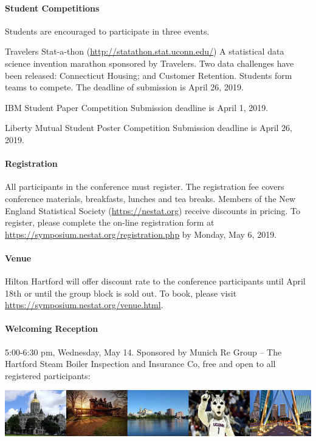 \documentclass[12pt]{article}
\begin{document}
\paragraph{Student Competitions} Students are encouraged to participate in three events.

\textsf{Travelers Stat-a-thon} (\url{http://statathon.stat.uconn.edu/})
A statistical data science invention marathon sponsored by Travelers. Two data challenges have been released: Connecticut Housing; and Customer Retention. Students form teams to compete. The deadline of submission is April 26, 2019.

\textsf{IBM Student Paper Competition} Submission deadline is April 1, 2019.

\textsf{Liberty Mutual Student Poster Competition} Submission deadline is April 26, 2019.


\paragraph{Registration}
All participants in the conference must register. The registration fee
covers conference materials, breakfasts, lunches and tea
breaks. Members of the New England Statistical Society
(\url{https://nestat.org}) receive discounts in pricing. To register,
please complete the on-line registration form at
\url{https://symposium.nestat.org/registration.php}
by Monday, May 6, 2019.


\paragraph{Venue}
Hilton Hartford will offer discount rate to the conference
participants until April 18th or until the group block is sold out. To
book, please visit
\url{https://symposium.nestat.org/venue.html}.

\paragraph{Welcoming Reception}  5:00-6:30 pm, Wednesday, May 14.
Sponsored by Munich Re Group -- The Hartford
Steam Boiler Inspection and Insurance Co, free and open to all registered participants:

\vfill

\begin{center}
\includegraphics[width=\textwidth]{hartford-banner}
\end{center}
\end{document}
